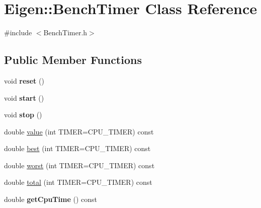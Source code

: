 \hypertarget{class_eigen_1_1_bench_timer}{}\section{Eigen\+:\+:Bench\+Timer Class Reference}
\label{class_eigen_1_1_bench_timer}


{\ttfamily \#include $<$Bench\+Timer.\+h$>$}

\subsection*{Public Member Functions}
\begin{DoxyCompactItemize}
\item 
\mbox{\label{class_eigen_1_1_bench_timer_a32a7276d10363d2d166234d7fb07182a}} 
void {\bfseries reset} ()
\item 
\mbox{\label{class_eigen_1_1_bench_timer_a6b01cc1c0408353022174b867ab29dc9}} 
void {\bfseries start} ()
\item 
\mbox{\label{class_eigen_1_1_bench_timer_a367e14b2e9c1ab6d3f0ff7bcfcd5ee37}} 
void {\bfseries stop} ()
\item 
double \hyperlink{class_eigen_1_1_bench_timer_a26760f963ed8b64c126159bfea57735e}{value} (int T\+I\+M\+ER=C\+P\+U\+\_\+\+T\+I\+M\+ER) const
\item 
double \hyperlink{class_eigen_1_1_bench_timer_ae8b673b0fa356d3432c7a65c79e8af0e}{best} (int T\+I\+M\+ER=C\+P\+U\+\_\+\+T\+I\+M\+ER) const
\item 
double \hyperlink{class_eigen_1_1_bench_timer_ab912bf8bcae22898c85d907f0810173e}{worst} (int T\+I\+M\+ER=C\+P\+U\+\_\+\+T\+I\+M\+ER) const
\item 
double \hyperlink{class_eigen_1_1_bench_timer_af341aa613dba2d4a3d167093197e4e7a}{total} (int T\+I\+M\+ER=C\+P\+U\+\_\+\+T\+I\+M\+ER) const
\item 
\mbox{\label{class_eigen_1_1_bench_timer_a5e1faf3cf0c7958128fc4ad10377f51c}} 
double {\bfseries get\+Cpu\+Time} () const
\item 
\mbox{\label{class_eigen_1_1_bench_timer_af215200501091952ffa5e919fe31cfca}} 

\end{DoxyCompactItemize}
